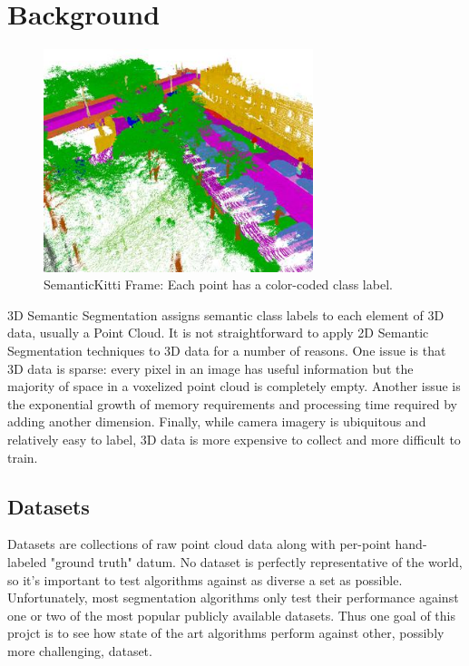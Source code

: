 \section{Background}
\label{chap:background}

\begin{figure}[htp]
  \centering
  \includegraphics[width=0.7\textwidth]{images/semantickitti.jpg}
  \caption{SemanticKitti Frame: Each point has a color-coded class label.}
  \label{fig:semantickitti-frame}
\end{figure}

3D Semantic Segmentation assigns semantic class labels to each element of 3D data, usually a Point Cloud. It is not straightforward to apply 2D Semantic Segmentation techniques to 3D data for a number of reasons. One issue is that 3D data is sparse: every pixel in an image has useful information but the majority of space in a voxelized point cloud is completely empty. Another issue is the exponential growth of memory requirements and processing time required by adding another dimension. Finally, while camera imagery is ubiquitous and relatively easy to label, 3D data is more expensive to collect and more difficult to train.

\subsection{Datasets}
\label{sec:datasets}

Datasets are collections of raw point cloud data along with per-point hand-labeled "ground truth" datum. No dataset is perfectly representative of the world, so it's important to test algorithms against as diverse a set as possible. Unfortunately, most segmentation algorithms only test their performance against one or two of the most popular publicly available datasets. Thus one goal of this projct is to see how state of the art algorithms perform against other, possibly more challenging, dataset.

